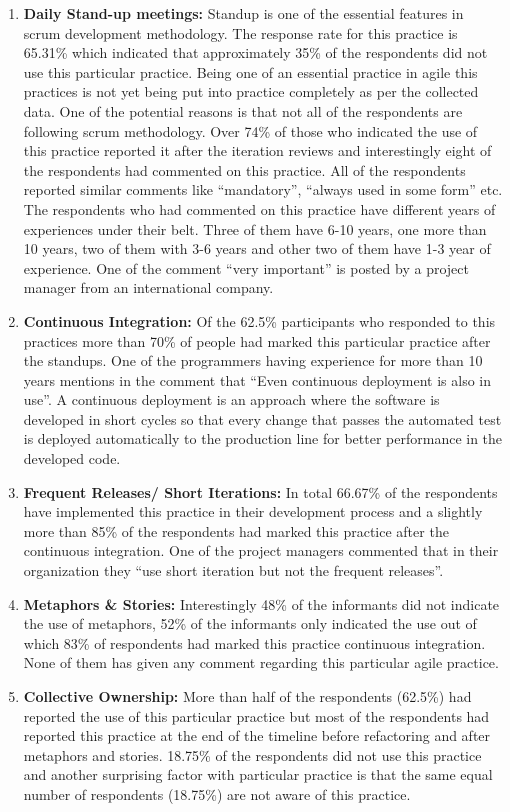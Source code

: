 \documentclass[a4paper,oneside]{bth}
\begin{document}
\begin{enumerate}
\item \textbf{Daily Stand-up meetings:} Standup is one of the essential features in scrum development methodology. The response rate for this practice is 65.31\% which indicated that approximately 35\% of the respondents did not use this particular practice. Being one of an essential practice in agile this practices is not yet being put into practice completely as per the collected data. One of the potential reasons is that not all of the respondents are following scrum methodology. Over 74\% of those who indicated the use of this practice reported it after the iteration reviews and interestingly eight of the respondents had commented on this practice. All of the respondents reported similar comments like “mandatory”, “always used in some form” etc. The respondents who had commented on this practice have different years of experiences under their belt. Three of them have 6-10 years, one more than 10 years, two of them with 3-6 years and other two of them have 1-3 year of experience. One of the comment “very important” is posted by a project manager from an international company.
\item \textbf{Continuous Integration:} Of the 62.5\% participants who responded to this practices more than 70\% of people had marked this particular practice after the standups. One of the programmers having experience for more than 10 years mentions in the comment that “Even continuous deployment is also in use”. A continuous deployment is an approach where the software is developed in short cycles so that every change that passes the automated test is deployed automatically to the production line for better performance in the developed code.
\item \textbf{Frequent Releases/ Short Iterations:} In total 66.67\% of the respondents have implemented this practice in their development process and a slightly more than 85\% of the respondents had marked this practice after the continuous integration. One of the project managers commented that in their organization they “use short iteration but not the frequent releases”.
\item \textbf{Metaphors \& Stories:} Interestingly 48\% of the informants did not indicate the use of metaphors, 52\% of the informants only indicated the use out of which 83\% of respondents had marked this practice continuous integration. None of them has given any comment regarding this particular agile practice.
\item \textbf{Collective Ownership:} More than half of the respondents (62.5\%) had reported the use of this particular practice but most of the respondents had reported this practice at the end of the timeline before refactoring and after metaphors and stories. 18.75\% of the respondents did not use this practice and another surprising factor with particular practice is that the same equal number of respondents (18.75\%) are not aware of this practice.

\end{enumerate}
\end{document}

